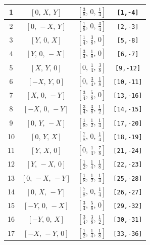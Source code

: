 \documentclass[fleqn,8pt]{jsarticle}
\begin{document}
\begin{longtable}{cccc}
1 & $\left[ 0,\, X,\, Y \right]$ & $\left[ \frac{3}{8},\, 0,\, \frac{1}{4} \right]$ & {\tt [1,-4]} \\ \hline
2 & $\left[ 0,\, - X,\, Y \right]$ & $\left[ \frac{1}{8},\, 0,\, \frac{3}{4} \right]$ & {\tt [2,-3]} \\ \hline
3 & $\left[ Y,\, 0,\, X \right]$ & $\left[ \frac{1}{4},\, \frac{3}{8},\, 0 \right]$ & {\tt [5,-8]} \\ \hline
4 & $\left[ Y,\, 0,\, - X \right]$ & $\left[ \frac{3}{4},\, \frac{1}{8},\, 0 \right]$ & {\tt [6,-7]} \\ \hline
5 & $\left[ X,\, Y,\, 0 \right]$ & $\left[ 0,\, \frac{1}{4},\, \frac{3}{8} \right]$ & {\tt [9,-12]} \\ \hline
6 & $\left[ - X,\, Y,\, 0 \right]$ & $\left[ 0,\, \frac{3}{4},\, \frac{1}{8} \right]$ & {\tt [10,-11]} \\ \hline
7 & $\left[ X,\, 0,\, - Y \right]$ & $\left[ \frac{3}{4},\, \frac{5}{8},\, 0 \right]$ & {\tt [13,-16]} \\ \hline
8 & $\left[ - X,\, 0,\, - Y \right]$ & $\left[ \frac{3}{4},\, \frac{3}{8},\, \frac{1}{2} \right]$ & {\tt [14,-15]} \\ \hline
9 & $\left[ 0,\, Y,\, - X \right]$ & $\left[ \frac{1}{8},\, \frac{1}{2},\, \frac{1}{4} \right]$ & {\tt [17,-20]} \\ \hline
10 & $\left[ 0,\, Y,\, X \right]$ & $\left[ \frac{7}{8},\, 0,\, \frac{1}{4} \right]$ & {\tt [18,-19]} \\ \hline
11 & $\left[ Y,\, X,\, 0 \right]$ & $\left[ 0,\, \frac{1}{4},\, \frac{7}{8} \right]$ & {\tt [21,-24]} \\ \hline
12 & $\left[ Y,\, - X,\, 0 \right]$ & $\left[ \frac{1}{2},\, \frac{1}{4},\, \frac{1}{8} \right]$ & {\tt [22,-23]} \\ \hline
13 & $\left[ 0,\, - X,\, - Y \right]$ & $\left[ \frac{1}{8},\, \frac{1}{2},\, \frac{1}{4} \right]$ & {\tt [25,-28]} \\ \hline
14 & $\left[ 0,\, X,\, - Y \right]$ & $\left[ \frac{7}{8},\, 0,\, \frac{1}{4} \right]$ & {\tt [26,-27]} \\ \hline
15 & $\left[ - Y,\, 0,\, - X \right]$ & $\left[ \frac{3}{4},\, \frac{5}{8},\, 0 \right]$ & {\tt [29,-32]} \\ \hline
16 & $\left[ - Y,\, 0,\, X \right]$ & $\left[ \frac{3}{4},\, \frac{3}{8},\, \frac{1}{2} \right]$ & {\tt [30,-31]} \\ \hline
17 & $\left[ - X,\, - Y,\, 0 \right]$ & $\left[ \frac{1}{2},\, \frac{1}{4},\, \frac{1}{8} \right]$ & {\tt [33,-36]} \\ \hline

\end{longtable}
\end{document}
